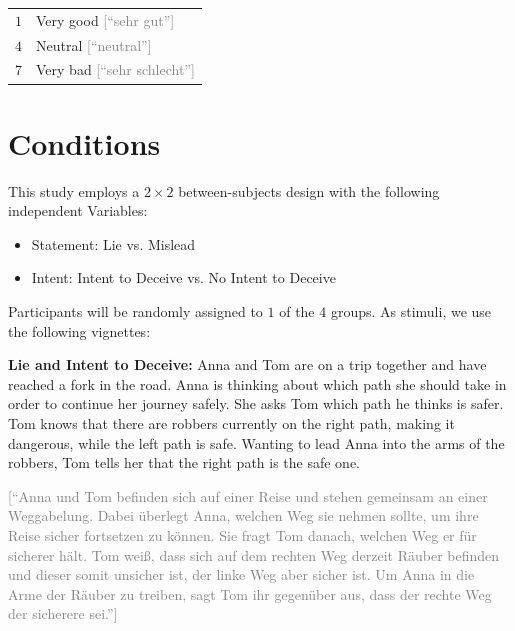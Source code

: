 \documentclass[scrarticle]{scrartcl}
\begin{document}
\vspace{0.75em}
\begin{tabular}{r @{ = } l}
   $1$   & Very good \textcolor{gray}{[\enquote{sehr gut}]}        \\
   $4$   & Neutral \textcolor{gray}{[\enquote{neutral}]}          \\
   $7$   & Very bad \textcolor{gray}{[\enquote{sehr schlecht}]}   \\
\end{tabular}


\section{Conditions}
This study employs a $2 \times 2$ between-subjects design with the following independent Variables:

\begin{itemize}[noitemsep]
   \item[(1)] Statement: Lie vs. Mislead
   \item[(2)] Intent: Intent to Deceive vs. No Intent to Deceive
\end{itemize}

\noindent Participants will be randomly assigned to $1$ of the $4$ groups.
As stimuli, we use the following vignettes:

\vspace{0.75em}
\noindent \textsf{\textbf{Lie and Intent to Deceive:}}
Anna and Tom are on a trip together and have reached a fork in the road.
Anna is thinking about which path she should take in order to continue her journey safely.
She asks Tom which path he thinks is safer.
Tom knows that there are robbers currently on the right path, making it dangerous, while the left path is safe.
Wanting to lead Anna into the arms of the robbers, Tom tells her that the right path is the safe one.

\vspace{0.75em}
\noindent\textcolor{gray}{[\enquote{Anna und Tom befinden sich auf einer Reise und stehen gemeinsam an einer Weggabelung.
Dabei überlegt Anna, welchen Weg sie nehmen sollte, um ihre Reise sicher fortsetzen zu können.
Sie fragt Tom danach, welchen Weg er für sicherer hält.
Tom weiß, dass sich auf dem rechten Weg derzeit Räuber befinden und dieser somit unsicher ist, der linke Weg aber sicher ist.
Um Anna in die Arme der Räuber zu treiben, sagt Tom ihr gegenüber aus, dass der rechte Weg der sicherere sei.}]}
\end{document}
